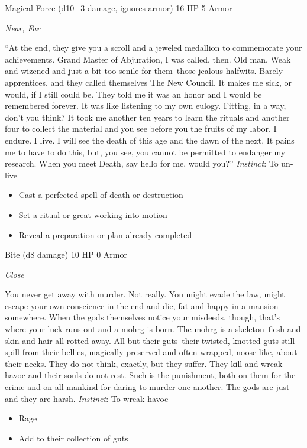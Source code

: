 \HRule
{}

Magical Force (d10+3 damage, ignores armor)\hspace*{\fill} 16 HP 5 Armor

\emph{Near, Far}

\HRule
``At the end, they give you a scroll and a jeweled medallion to commemorate your achievements. Grand Master of Abjuration, I was called, then. Old man. Weak and wizened and just a bit too senile for them--those jealous halfwits. Barely apprentices, and they called themselves The New Council. It makes me sick, or would, if I still could be. They told me it was an honor and I would be remembered forever. It was like listening to my own eulogy. Fitting, in a way, don't you think? It took me another ten years to learn the rituals and another four to collect the material and you see before you the fruits of my labor. I endure. I live. I will see the death of this age and the dawn of the next. It pains me to have to do this, but, you see, you cannot be permitted to endanger my research. When you meet Death, say hello for me, would you?'' \emph{Instinct}: To un-live
\begin{itemize}
\item Cast a perfected spell of death or destruction
\item Set a ritual or great working into motion
\item Reveal a preparation or plan already completed
\end{itemize}

\HRule
{}

Bite (d8 damage)\hspace*{\fill} 10 HP 0 Armor

\emph{Close}

\HRule
You never get away with murder. Not really. You might evade the law, might escape your own conscience in the end and die, fat and happy in a mansion somewhere. When the gods themselves notice your misdeeds, though, that's where your luck runs out and a mohrg is born. The mohrg is a skeleton--flesh and skin and hair all rotted away. All but their guts--their twisted, knotted guts still spill from their bellies, magically preserved and often wrapped, noose-like, about their necks. They do not think, exactly, but they suffer. They kill and wreak havoc and their souls do not rest. Such is the punishment, both on them for the crime and on all mankind for daring to murder one another. The gods are just and they are harsh. \emph{Instinct}: To wreak havoc
\begin{itemize}
\item Rage
\item Add to their collection of guts
\end{itemize}

